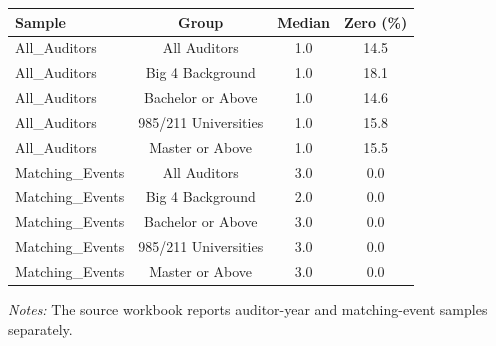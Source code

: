 \documentclass[10pt]{article}
\begin{document}
\begin{minipage}{19cm}\fontsize{10}{12}\selectfont\setlength{\tabcolsep}{4pt}\renewcommand{\arraystretch}{1.12}


\centering
{}
\begin{threeparttable}
\begin{tabular}{p{}ccc}
\toprule
Sample & Group & Median & Zero (\%) \\
\midrule
All\_Auditors & All Auditors & 1.0 & 14.5 \\
All\_Auditors & Big 4 Background & 1.0 & 18.1 \\
All\_Auditors & Bachelor or Above & 1.0 & 14.6 \\
All\_Auditors & 985/211 Universities & 1.0 & 15.8 \\
All\_Auditors & Master or Above & 1.0 & 15.5 \\
Matching\_Events & All Auditors & 3.0 & 0.0 \\
Matching\_Events & Big 4 Background & 2.0 & 0.0 \\
Matching\_Events & Bachelor or Above & 3.0 & 0.0 \\
Matching\_Events & 985/211 Universities & 3.0 & 0.0 \\
Matching\_Events & Master or Above & 3.0 & 0.0 \\
\bottomrule
\end{tabular}
\begin{tablenotes}\fontsize{9}{11}\selectfont
\item \raggedright \fontsize{9}{11}\selectfont \textit{Notes:} The source workbook reports auditor-year and matching-event samples separately.
\end{tablenotes}
\end{threeparttable}

\end{minipage}
\end{document}
